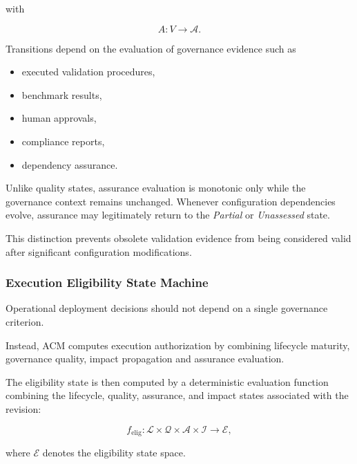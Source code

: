 \documentclass[10pt]{article}
\begin{document}
with

\begin{equation}
A
:
V
\rightarrow
\mathcal{A}.
\label{eq:assurance_state_function}
\end{equation}

Transitions depend on the evaluation of governance evidence such as

\begin{itemize}
    \item executed validation procedures,
    \item benchmark results,
    \item human approvals,
    \item compliance reports,
    \item dependency assurance.
\end{itemize}

Unlike quality states, assurance evaluation is monotonic only while the
governance context remains unchanged.
Whenever configuration dependencies evolve, assurance may legitimately return
to the \emph{Partial} or \emph{Unassessed} state.

This distinction prevents obsolete validation evidence from being considered
valid after significant configuration modifications.

\subsubsection{Execution Eligibility State Machine}

Operational deployment decisions should not depend on a single governance
criterion.

Instead, ACM computes execution authorization by combining lifecycle maturity,
governance quality, impact propagation and assurance evaluation.

The eligibility state is then computed by a deterministic evaluation function combining the lifecycle, quality, assurance, and impact states associated with the revision:

\begin{equation}
	\label{eq:eligibility_function}
	f_{\mathrm{elig}}
	:
	\mathcal{L}
	\times
	\mathcal{Q}
	\times
	\mathcal{A}
	\times
	\mathcal{I}
	\rightarrow
	\mathcal{E},
\end{equation}

where $\mathcal{E}$ denotes the eligibility state space.
\end{document}

